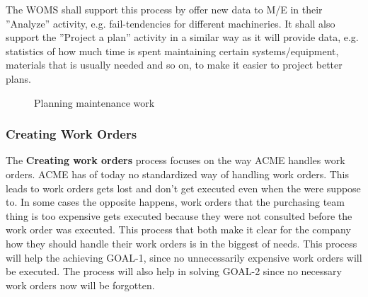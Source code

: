 The WOMS shall support this process by offer new data to M/E in their ''Analyze'' activity, e.g. fail-tendencies for different machineries. It shall also support the ''Project a plan'' activity in a similar way as it will provide data, e.g. statistics of how much time is spent maintaining certain systems/equipment, materials that is usually needed and so on, to make it easier to project better plans.
\begin{figure}[H]
	\centering
	\setlength\fboxsep{7pt}
	\setlength\fboxrule{0.5pt}
	\label{fig:planning}
	\caption{Planning maintenance work}
\end{figure}
%
\subsubsection{Creating Work Orders}
\label{sec:bp2}
The \textbf{Creating work orders} process focuses on the way ACME handles work orders. ACME has of today no standardized way of handling work orders. This leads to work orders gets lost and don't get executed even when the were suppose to. In some cases the opposite happens, work orders that the purchasing team thing is too expensive gets executed because they were not consulted before the work order was executed. This process that both make it clear for the company how they should handle their work orders is in the biggest of needs. This process will help the achieving GOAL-1, since no unnecessarily expensive work orders will be executed. The process will also help in solving GOAL-2 since no necessary work orders now will be forgotten. 

